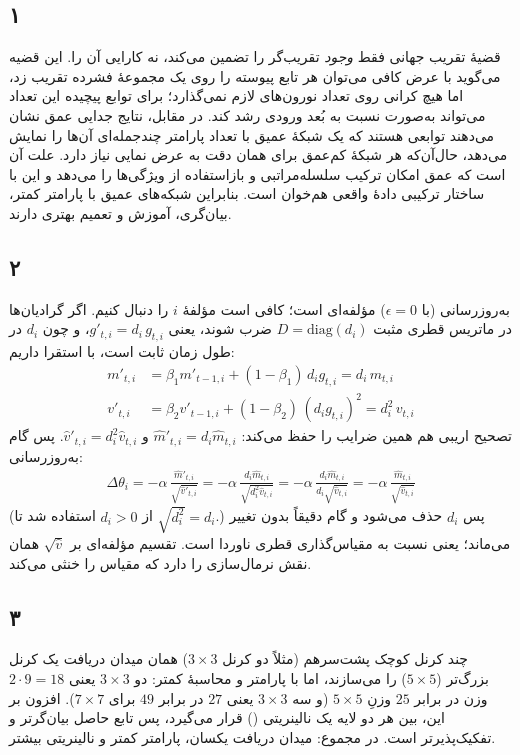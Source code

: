 \subsection*{۱}
قضیهٔ تقریب جهانی فقط \emph{وجود} تقریب‌گر را تضمین می‌کند، نه کارایی آن را. این قضیه می‌گوید با عرض کافی می‌توان هر تابع پیوسته را روی یک مجموعهٔ فشرده تقریب زد، اما هیچ کرانی روی تعداد نورون‌های لازم نمی‌گذارد؛ برای توابع پیچیده این تعداد می‌تواند به‌صورت
نسبت به بُعد ورودی رشد کند. در مقابل، نتایج جدایی عمق نشان می‌دهند توابعی هستند که یک شبکهٔ عمیق با تعداد پارامتر چندجمله‌ای آن‌ها را نمایش می‌دهد، حال‌آن‌که هر شبکهٔ کم‌عمق برای همان دقت به عرض نمایی نیاز دارد. علت آن است که عمق امکان ترکیب سلسله‌مراتبی و بازاستفاده از ویژگی‌ها را می‌دهد و این با ساختار ترکیبی دادهٔ واقعی هم‌خوان است. بنابراین شبکه‌های عمیق با پارامتر کمتر، بیان‌گری، آموزش و تعمیم بهتری دارند.

\subsection*{۲}
به‌روزرسانی
(با $\epsilon=0$) مؤلفه‌ای است؛ کافی است مؤلفهٔ $i$ را دنبال کنیم. اگر گرادیان‌ها در ماتریس قطری مثبت $D=\mathrm{diag}(d_i)$ ضرب شوند، یعنی $g'_{t,i}=d_i\,g_{t,i}$، و چون $d_i$ در طول زمان ثابت است، با استقرا داریم:
\begin{align*}
m'_{t,i} &= \beta_1 m'_{t-1,i} + (1-\beta_1)\,d_i g_{t,i} = d_i\, m_{t,i} \\
v'_{t,i} &= \beta_2 v'_{t-1,i} + (1-\beta_2)\,(d_i g_{t,i})^2 = d_i^2\, v_{t,i}
\end{align*}
تصحیح اریبی هم همین ضرایب را حفظ می‌کند: $\hat m'_{t,i}=d_i\hat m_{t,i}$ و $\hat v'_{t,i}=d_i^2\hat v_{t,i}$. پس گام به‌روزرسانی:
\begin{align*}
\Delta\theta_i = -\alpha\,\frac{\hat m'_{t,i}}{\sqrt{\hat v'_{t,i}}}
= -\alpha\,\frac{d_i\hat m_{t,i}}{\sqrt{d_i^2\hat v_{t,i}}}
= -\alpha\,\frac{d_i\hat m_{t,i}}{d_i\sqrt{\hat v_{t,i}}}
= -\alpha\,\frac{\hat m_{t,i}}{\sqrt{\hat v_{t,i}}}
\end{align*}
(از $d_i>0$ استفاده شد تا $\sqrt{d_i^2}=d_i$.) پس $d_i$ حذف می‌شود و گام دقیقاً بدون تغییر می‌ماند؛ یعنی
نسبت به مقیاس‌گذاری قطری ناوردا است. تقسیم مؤلفه‌ای بر $\sqrt{\hat v}$ همان نقش نرمال‌سازی را دارد که مقیاس را خنثی می‌کند.

\subsection*{۳}
چند کرنل کوچک پشت‌سرهم (مثلاً دو کرنل $3\times3$) همان میدان دریافت یک کرنل بزرگ‌تر ($5\times5$) را می‌سازند، اما با پارامتر و محاسبهٔ کمتر: دو $3\times3$ یعنی $2\cdot9=18$ وزن در برابر $25$ وزنِ $5\times5$ (و سه $3\times3$ یعنی $27$ در برابر $49$ برای $7\times7$). افزون بر این، بین هر دو لایه یک نالینریتی () قرار می‌گیرد، پس تابع حاصل بیان‌گرتر و تفکیک‌پذیرتر است. در مجموع: میدان دریافت یکسان، پارامتر کمتر و نالینریتی بیشتر.

